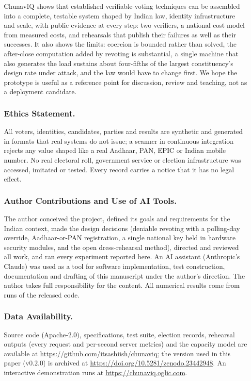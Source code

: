 \documentclass[runningheads]{llncs}
\begin{document}
ChunavIQ shows that established verifiable-voting techniques can be assembled into a complete, testable system shaped by Indian law, identity infrastructure and scale, with public evidence at every step: two verifiers, a national cost model from measured costs, and rehearsals that publish their failures as well as their successes. It also shows the limits: coercion is bounded rather than solved, the after-close computation added by revoting is substantial, a single machine that also generates the load sustains about four-fifths of the largest constituency's design rate under attack, and the law would have to change first. We hope the prototype is useful as a reference point for discussion, review and teaching, not as a deployment candidate.

\subsubsection*{Ethics Statement.}
All voters, identities, candidates, parties and results are synthetic and generated in formats that real systems do not issue; a scanner in continuous integration rejects any value shaped like a real Aadhaar, PAN, EPIC or Indian mobile number. No real electoral roll, government service or election infrastructure was accessed, imitated or tested. Every record carries a notice that it has no legal effect.

\subsubsection*{Author Contributions and Use of AI Tools.}
The author conceived the project, defined its goals and requirements for the Indian context, made the design decisions (deniable revoting with a polling-day override, Aadhaar-or-PAN registration, a single national key held in hardware security modules, and the open dress-rehearsal method), directed and reviewed all work, and ran every experiment reported here. An AI assistant (Anthropic's Claude) was used as a tool for software implementation, test construction, documentation and drafting of this manuscript under the author's direction. The author takes full responsibility for the content. All numerical results come from runs of the released code.

\subsubsection*{Data Availability.}
Source code (Apache-2.0), specifications, test suite, election records, rehearsal outputs (every request and per-second server metrics) and the capacity model are available at \url{https://github.com/itsashiish/chunaviq}; the version used in this paper (v0.2.0) is archived at \url{https://doi.org/10.5281/zenodo.23442948}. An interactive demonstration runs at \url{https://chunaviq.oglic.com}.



\end{document}
